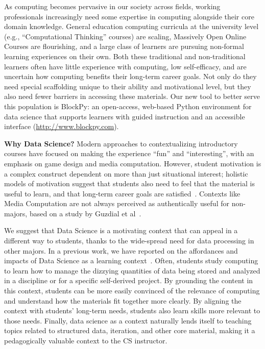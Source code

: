 \documentclass[10pt, conference, compsocconf]{IEEEtran}
\begin{document}
As computing becomes pervasive in our society across fields, working professionals increasingly need some expertise in computing alongside their core domain knowledge.
General education computing curricula at the university level (e.g., ``Computational Thinking'' courses) are scaling, Massively Open Online Courses are flourishing, and a large class of learners are pursuing non-formal learning experiences on their own.
Both these traditional and non-traditional learners often have little experience with computing, low self-efficacy, and are uncertain how computing benefits their long-term career goals.
Not only do they need special scaffolding unique to their ability and motivational level, but they also need fewer barriers in accessing these materials.
Our new tool to better serve this population is BlockPy: an open-access, web-based Python environment for data science that supports learners with guided instruction and an accessible interface (\url{http://www.blockpy.com}).

\textbf{Why Data Science?}
Modern approaches to contextualizing introductory courses have focused on making the experience ``fun'' and ``interesting'', with an emphasis on game design and media computation.
However, student motivation is a complex construct dependent on more than just situational interest; holistic models of motivation suggest that students also need to feel that the material is useful to learn, and that long-term career goals are satisfied~\cite{jones-description}.
Contexts like Media Computation are not always perceived as authentically useful  for non-majors, based on a study by Guzdial et al~\cite{guzdial2006imagineering}.

We suggest that Data Science is a motivating context that can appeal in a different way to students, thanks to the wide-spread need for data processing in other majors.
In a previous work, we have reported on the affordances and impacts of Data Science as a learning context~\cite{sigcse17-corgis}.
Often, students study computing to learn how to manage the dizzying quantities of data being stored and analyzed in a discipline or for a specific self-derived project.
By grounding the content in this context, students can be more easily convinced of the relevance of computing and understand how the materials fit together more clearly.
By aligning the context with students' long-term needs, students also learn skills more relevant to those needs.
Finally, data science as a context naturally lends itself to teaching topics related to structured data, iteration, and other core material, making it a pedagogically valuable context to the CS instructor.
\end{document}
